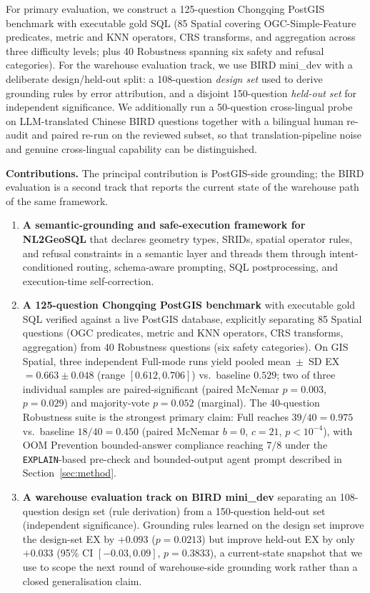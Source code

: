 \documentclass[11pt]{article}
\begin{document}
For primary evaluation, we construct a 125-question Chongqing PostGIS benchmark with executable gold SQL (85 Spatial covering OGC-Simple-Feature predicates, metric and KNN operators, CRS transforms, and aggregation across three difficulty levels; plus 40 Robustness spanning six safety and refusal categories). For the warehouse evaluation track, we use BIRD mini\_dev with a deliberate design/held-out split: a 108-question \emph{design set} used to derive grounding rules by error attribution, and a disjoint 150-question \emph{held-out set} for independent significance. We additionally run a 50-question cross-lingual probe on LLM-translated Chinese BIRD questions together with a bilingual human re-audit and paired re-run on the reviewed subset, so that translation-pipeline noise and genuine cross-lingual capability can be distinguished.

\medskip
\noindent\textbf{Contributions.} The principal contribution is PostGIS-side grounding; the BIRD evaluation is a second track that reports the current state of the warehouse path of the same framework.
\begin{enumerate}[leftmargin=*]
  \item \textbf{A semantic-grounding and safe-execution framework for NL2GeoSQL} that declares geometry types, SRIDs, spatial operator rules, and refusal constraints in a semantic layer and threads them through intent-conditioned routing, schema-aware prompting, SQL postprocessing, and execution-time self-correction.
  \item \textbf{A 125-question Chongqing PostGIS benchmark} with executable gold SQL verified against a live PostGIS database, explicitly separating 85 Spatial questions (OGC predicates, metric and KNN operators, CRS transforms, aggregation) from 40 Robustness questions (six safety categories). On GIS Spatial, three independent Full-mode runs yield pooled mean~$\pm$~SD EX$=0.663 \pm 0.048$ (range $[0.612, 0.706]$) vs.\ baseline $0.529$; two of three individual samples are paired-significant (paired McNemar $p=0.003$, $p=0.029$) and majority-vote $p=0.052$ (marginal). The 40-question Robustness suite is the strongest primary claim: Full reaches $39/40 = 0.975$ vs.\ baseline $18/40 = 0.450$ (paired McNemar $b=0$, $c=21$, $p<10^{-4}$), with OOM Prevention bounded-answer compliance reaching $7/8$ under the \texttt{EXPLAIN}-based pre-check and bounded-output agent prompt described in Section~\ref{sec:method}.
  \item \textbf{A warehouse evaluation track on BIRD mini\_dev} separating an 108-question design set (rule derivation) from a 150-question held-out set (independent significance). Grounding rules learned on the design set improve the design-set EX by $+0.093$ ($p=0.0213$) but improve held-out EX by only $+0.033$ (95\% CI $[-0.03, 0.09]$, $p=0.3833$), a current-state snapshot that we use to scope the next round of warehouse-side grounding work rather than a closed generalisation claim.
\end{enumerate}
\end{document}
